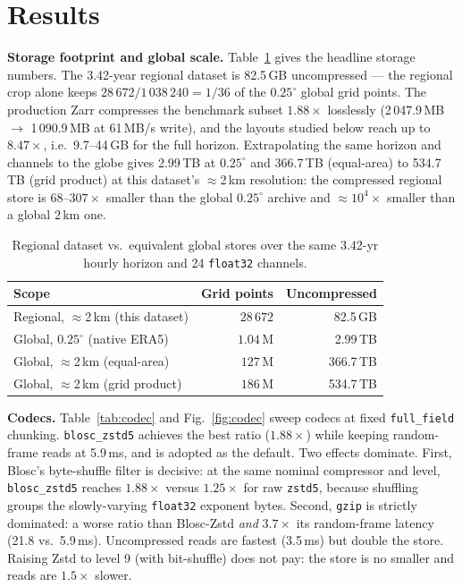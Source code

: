 \documentclass[conference]{IEEEtran}
\begin{document}
\section{Results}

\textbf{Storage footprint and global scale.}
Table~\ref{tab:size} gives the headline storage numbers. The 3.42-year
regional dataset is 82.5\,GB uncompressed --- the regional crop alone keeps
$28\,672/1\,038\,240 = 1/36$ of the $0.25^\circ$ global grid points. The
production Zarr compresses the benchmark subset $1.88\times$ losslessly
(2\,047.9\,MB $\rightarrow$ 1\,090.9\,MB at 61\,MB/s write), and the layouts
studied below reach up to $8.47\times$, i.e.\ 9.7--44\,GB for the full
horizon. Extrapolating the same horizon and channels to the globe gives
2.99\,TB at $0.25^\circ$ and 366.7\,TB (equal-area) to 534.7\,TB (grid
product) at this dataset's $\approx$2\,km resolution: the compressed regional
store is $68$--$307\times$ smaller than the global $0.25^\circ$ archive and
$\approx$$10^4\times$ smaller than a global 2\,km one.

\begin{table}[t]
\caption{Regional dataset vs.\ equivalent global stores over the same
3.42-yr hourly horizon and 24 \texttt{float32} channels.}
\label{tab:size}
\centering\small
\begin{tabular}{@{}lrr@{}}
\toprule
Scope & Grid points & Uncompressed \\
\midrule
Regional, $\approx$2\,km (this dataset) & $28\,672$ & 82.5\,GB \\
Global, $0.25^\circ$ (native ERA5) & $1.04$\,M & 2.99\,TB \\
Global, $\approx$2\,km (equal-area) & $127$\,M & 366.7\,TB \\
Global, $\approx$2\,km (grid product) & $186$\,M & 534.7\,TB \\
\bottomrule
\end{tabular}
\end{table}

\textbf{Codecs.}
Table~\ref{tab:codec} and Fig.~\ref{fig:codec} sweep codecs at fixed
\texttt{full\_field} chunking. \texttt{blosc\_zstd5} achieves the best ratio
($1.88\times$) while keeping random-frame reads at 5.9\,ms, and is adopted as
the default. Two effects dominate. First, Blosc's byte-shuffle filter is
decisive: at the same nominal compressor and level, \texttt{blosc\_zstd5}
reaches $1.88\times$ versus $1.25\times$ for raw \texttt{zstd5}, because
shuffling groups the slowly-varying \texttt{float32} exponent bytes. Second,
\texttt{gzip} is strictly dominated: a worse ratio than Blosc-Zstd
\emph{and} $3.7\times$ its random-frame latency (21.8 vs.\ 5.9\,ms).
Uncompressed reads are fastest (3.5\,ms) but double the store. Raising Zstd
to level 9 (with bit-shuffle) does not pay: the store is no smaller and reads
are $1.5\times$ slower.
\end{document}
